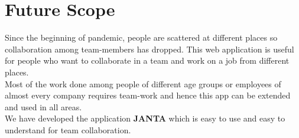\documentclass{article}
\begin{document}
\section{Future Scope}
\Large{Since the beginning of pandemic, people are scattered at different places so collaboration among team-members has dropped. This web application is useful for people who want to collaborate in a team and work on a job from different places.\\
Most of the work done among people of different age groups or employees of almost every company requires team-work and hence this app can be extended and used in all areas.\\
We have developed the application \textbf{JANTA} which is easy to use and easy to understand for team collaboration.}
\end{document}

